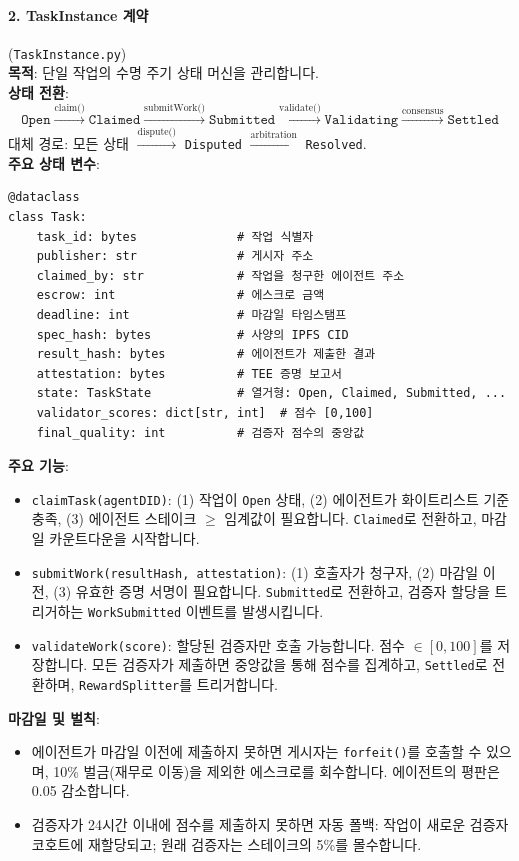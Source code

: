 \documentclass[11pt]{article}
\begin{document}
\paragraph{2. TaskInstance 계약} (\texttt{TaskInstance.py})\\
\textbf{목적}: 단일 작업의 수명 주기 상태 머신을 관리합니다.\\
\textbf{상태 전환}:
\begin{equation}
\texttt{Open} \xrightarrow{\text{claim()}} \texttt{Claimed} \xrightarrow{\text{submitWork()}} \texttt{Submitted} \xrightarrow{\text{validate()}} \texttt{Validating} \xrightarrow{\text{consensus}} \texttt{Settled}
\end{equation}
대체 경로: 모든 상태 $\xrightarrow{\text{dispute()}}$ \texttt{Disputed} $\xrightarrow{\text{arbitration}}$ \texttt{Resolved}.\\
\textbf{주요 상태 변수}:
\begin{verbatim}
@dataclass
class Task:
    task_id: bytes              # 작업 식별자
    publisher: str              # 게시자 주소
    claimed_by: str             # 작업을 청구한 에이전트 주소
    escrow: int                 # 에스크로 금액
    deadline: int               # 마감일 타임스탬프
    spec_hash: bytes            # 사양의 IPFS CID
    result_hash: bytes          # 에이전트가 제출한 결과
    attestation: bytes          # TEE 증명 보고서
    state: TaskState            # 열거형: Open, Claimed, Submitted, ...
    validator_scores: dict[str, int]  # 점수 [0,100]
    final_quality: int          # 검증자 점수의 중앙값
\end{verbatim}
\textbf{주요 기능}:
\begin{itemize}[noitemsep]
  \item \texttt{claimTask(agentDID)}: (1) 작업이 \texttt{Open} 상태, (2) 에이전트가 화이트리스트 기준 충족, (3) 에이전트 스테이크 $\geq$ 임계값이 필요합니다. \texttt{Claimed}로 전환하고, 마감일 카운트다운을 시작합니다.
  \item \texttt{submitWork(resultHash, attestation)}: (1) 호출자가 청구자, (2) 마감일 이전, (3) 유효한 증명 서명이 필요합니다. \texttt{Submitted}로 전환하고, 검증자 할당을 트리거하는 \texttt{WorkSubmitted} 이벤트를 발생시킵니다.
  \item \texttt{validateWork(score)}: 할당된 검증자만 호출 가능합니다. 점수 $\in [0,100]$를 저장합니다. 모든 검증자가 제출하면 중앙값을 통해 점수를 집계하고, \texttt{Settled}로 전환하며, \texttt{RewardSplitter}를 트리거합니다.
\end{itemize}
\textbf{마감일 및 벌칙}:
\begin{itemize}[noitemsep]
  \item 에이전트가 마감일 이전에 제출하지 못하면 게시자는 \texttt{forfeit()}를 호출할 수 있으며, 10\% 벌금(재무로 이동)을 제외한 에스크로를 회수합니다. 에이전트의 평판은 0.05 감소합니다.
  \item 검증자가 24시간 이내에 점수를 제출하지 못하면 자동 폴백: 작업이 새로운 검증자 코호트에 재할당되고; 원래 검증자는 스테이크의 5\%를 몰수합니다.
\end{itemize}
\end{document}
